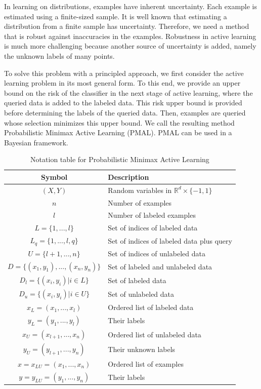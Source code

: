 	In learning on distributions, examples have inherent uncertainty. Each example is estimated using a finite-sized sample. It is well known that estimating a distribution from a finite sample has uncertainty. Therefore, we need a method that is robust against inaccuracies in the examples. Robustness in active learning is much more challenging because another source of uncertainty is added, namely the unknown labels of many points.
	
	To solve this problem with a principled approach, we first consider the active learning problem in its most general form. To this end, we provide an upper bound on the risk of the classifier in the next stage of active learning, where the queried data is added to the labeled data. This risk upper bound is provided before determining the labels of the queried data. Then, examples are queried whose selection minimizes this upper bound. We call the resulting method Probabilistic Minimax Active Learning (PMAL). PMAL can be used in a Bayesian framework.
	
	\begin{table}[h!]
		\centering
		\caption{Notation table for Probabilistic Minimax Active Learning}
		\label{tab:pmal-notation}
		\begin{tabular}{c|l}
			\hline
			Symbol & Description \\
			\hline
			$(X, Y)$ & Random variables in $\mathbb{R}^d \times \{-1, 1\}$ \\
			$n$ & Number of examples \\
			$l$ & Number of labeled examples \\
			$L = \{1, ..., l\}$ & Set of indices of labeled data \\
			$L_q = \{1, ..., l, q\}$ & Set of indices of labeled data plus query \\
			$U = \{l+1, ..., n\}$ & Set of indices of unlabeled data \\
			$D = \{(x_1, y_1), ..., (x_n, y_n)\}$ & Set of labeled and unlabeled data \\
			$D_l = \{(x_i, y_i) | i \in L\}$ & Set of labeled data \\
			$D_u = \{(x_i, y_i) | i \in U\}$ & Set of unlabeled data \\
			$x_L = (x_1, ..., x_l)$ & Ordered list of labeled data \\
			$y_L = (y_1, ..., y_l)$ & Their labels \\
			$x_U = (x_{l+1}, ..., x_n)$ & Ordered list of unlabeled data \\
			$y_U = (y_{l+1}, ..., y_n)$ & Their unknown labels \\
			$x = x_{LU} = (x_1, ..., x_n)$ & Ordered list of examples \\
			$y = y_{LU} = (y_1, ..., y_n)$ & Their labels \\
			\hline
		\end{tabular}
	\end{table}
	
